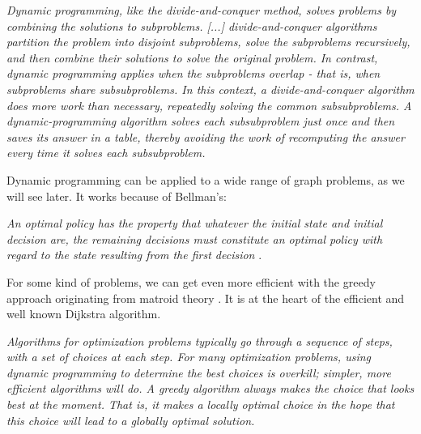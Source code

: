 \begin{definition}
\textit{Dynamic programming, like the divide-and-conquer method, solves problems by combining the solutions to subproblems. %
[...] divide-and-conquer algorithms partition the problem into disjoint subproblems, solve the subproblems recursively, and then combine their solutions to solve the original problem. In contrast, dynamic programming applies when the subproblems overlap - that is, when subproblems share subsubproblems. In this context, a divide-and-conquer algorithm does more work than necessary, repeatedly solving the common subsubproblems. A dynamic-programming algorithm solves each subsubproblem just once and then saves its answer in a table, thereby avoiding the work of recomputing the answer every time it solves each subsubproblem.} \cite[ch. 15]{cormen2009introduction} 
\end{definition}
Dynamic programming can be applied to a wide range of graph problems, as we will see later. It works because of Bellman's:
\begin{definition}
\textit{An optimal policy has the property that whatever the initial state and initial decision are, the remaining decisions must constitute an optimal policy with regard to the state resulting from the first decision} \cite[sec. 3.3]{bellman1957dynamic}.
\end{definition}

For some kind of problems, we can get even more efficient with the greedy approach originating from matroid theory \cite[sec. 13.7, p. 528]{ahuja1993network} \cite[ch. 5]{jungnickel2013graphs}. It is at the heart of the efficient and well known Dijkstra algorithm.
\begin{definition}[greedy]
\textit{Algorithms for optimization problems typically go through a sequence of steps, with a set of choices at each step. For many optimization problems, using dynamic programming to determine the best choices is overkill; simpler, more efficient algorithms will do. A greedy algorithm always makes the choice that looks best at the moment. That is, it makes a locally optimal choice in the hope that this choice will lead to a globally optimal solution.} \cite[ch. 16]{cormen2009introduction}
\end{definition}
